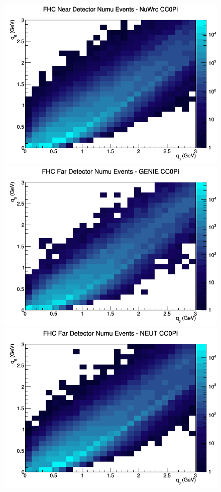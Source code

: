 \documentclass[12pt]{article}
\begin{document}
\begin{figure}[h]
\includegraphics[width=\linewidth]{eff_q0_q3/LAr/CC0Pi_FHC_ND_numu_q3_q0_NuWro.png}
\endminipage
\newline
{}
\includegraphics[width=\linewidth]{eff_q0_q3/LAr/CC0Pi_FHC_FD_numu_q3_q0_GENIE.png}
\endminipage
{}
\includegraphics[width=\linewidth]{eff_q0_q3/LAr/CC0Pi_FHC_FD_numu_q3_q0_NEUT.png}

\end{figure}
\end{document}
